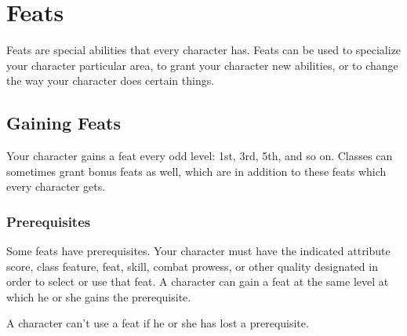 \chapter{Feats}\label{Feats}

Feats are special abilities that every character has.
Feats can be used to specialize your character particular area, to grant your character new abilities, or to change the way your character does certain things.

\section{Gaining Feats}
Your character gains a feat every odd level: 1st, 3rd, 5th, and so on.
Classes can sometimes grant bonus feats as well, which are in addition to these feats which every character gets.

\subsection{Prerequisites}
Some feats have prerequisites.
Your character must have the indicated attribute score, class feature, feat, skill, combat prowess, or other quality designated in order to select or use that feat.
A character can gain a feat at the same level at which he or she gains the prerequisite.

A character can't use a feat if he or she has lost a prerequisite.

